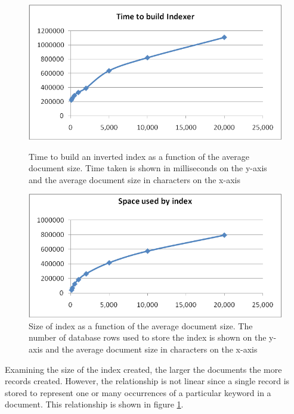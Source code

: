 \documentclass[10pt]{article}
\begin{document}
\begin{figure}[ht]
  \begin{minipage}[b]{0.5\linewidth}
    \centering
    \includegraphics[width=\textwidth]{docsizetimecomplexbuildindex}
    \caption{Time to build an inverted index as a function of the
      average document size. Time taken is shown in milliseconds on the
      y-axis and the average document size in characters on the x-axis} 
    \label{fig:docsizetimecomplexbuildindex}
  \end{minipage}
  \hspace{0.5cm}
  \begin{minipage}[b]{0.5\linewidth}
    \centering
    \includegraphics[width=\textwidth]{docsizespacecomplexbuildindex}
    \caption{Size of index as a function of the average document
      size. The number of database rows used to store the index is
      shown on the y-axis and the average document size in characters
      on the x-axis}  
    \label{fig:docsizespacecomplexbuildindex}
  \end{minipage}
\end{figure}

Examining the size of the index created, the larger the documents the
more records created. However, the relationship is not linear since a
single record is stored to represent one or many occurrences of a
particular keyword in a document. This relationship is shown in figure  
\ref{fig:docsizespacecomplexbuildindex}.  
\end{document}
